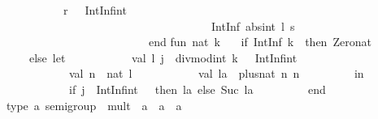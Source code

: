 \begin{isabellebody}
\begin{isamarkuptext}
\ \ \ \ \ \ \ \ \ \ r{}\ {}{}\ {}\ IntInf{}int{}{}{}\isanewline
\ \ \ \ \ \ \ \ \ \ \ \ \ \ \ \ \ \ \ \ \ \ \ \ \ \ \ \ \ \ \ \ \ \ \ \ IntInf{}{}\ {}abs{}int\ l{}\ s{}{}{}\isanewline
\ \ \ \ \ \ \ \ \ \ \ \ \ \ \ \ \ \ \ \ \ \ \ \ \ end{}{}{}{}\isanewline
\isanewline
fun\ nat\ k\ {}\isanewline
\ \ {}if\ IntInf{}{}{}\ {}k{}\ {}{}\ then\ Zero{}nat\isanewline
\ \ \ \ else\ let\isanewline
\ \ \ \ \ \ \ \ \ \ \ val\ {}l{}\ j{}\ {}\ divmod{}int\ k\ {}{}\ {}\ IntInf{}int{}{}\isanewline
\ \ \ \ \ \ \ \ \ \ \ val\ n\ {}\ nat\ l{}\isanewline
\ \ \ \ \ \ \ \ \ \ \ val\ la\ {}\ plus{}nat\ n\ n{}\isanewline
\ \ \ \ \ \ \ \ \ in\isanewline
\ \ \ \ \ \ \ \ \ \ \ {}if\ {}{}j\ {}\ IntInf{}int{}\ {}\ {}{}\ then\ la\ else\ Suc\ la{}\isanewline
\ \ \ \ \ \ \ \ \ end{}{}\isanewline
\isanewline
type\ {}a\ semigroup\ {}\ {}mult\ {}\ {}a\ {}{}\ {}a\ {}{}\ {}a{}{}\isanewline

\end{isamarkuptext}
\end{isabellebody}
